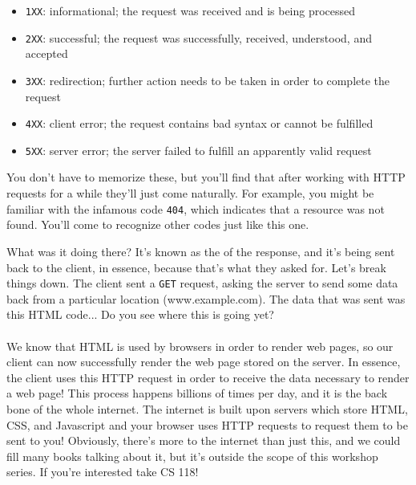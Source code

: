 \begin{itemize}
    \item \texttt{1XX}: informational; the request was received and is being processed
    \item \texttt{2XX}: successful; the request was successfully, received, understood, and accepted
    \item \texttt{3XX}: redirection; further action needs to be taken in order to complete the request
    \item \texttt{4XX}: client error; the request contains bad syntax or cannot be fulfilled
    \item \texttt{5XX}: server error; the server failed to fulfill an apparently valid request
\end{itemize}



You don't have to memorize these, but you'll find that after working with HTTP requests for a while they'll just come naturally. For example, you might be familiar with the infamous code \texttt{404}, which indicates that a resource was not found. You'll come to recognize other codes just like this one.

\begin{kaobox}[title=About the HTML we saw before\dots]
    What was it doing there? It's known as the  of the response, and it's being sent back to the client, in essence, because that's what they asked for. Let's break things down. The client sent a \texttt{GET} request, asking the server to send some data back from a particular location (www.example.com). The data that was sent was this HTML code... Do you see where this is going yet? \\ \\
    We know that HTML is used by browsers in order to render web pages, so our client can now successfully render the web page stored on the server. In essence, the client uses this HTTP request in order to receive the data necessary to render a web page! This process happens billions of times per day, and it is the back bone of the whole internet. The internet is built upon servers which store HTML, CSS, and Javascript and your browser uses HTTP requests to request them to be sent to you! Obviously, there's more to the internet than just this, and we could fill many books talking about it, but it's outside the scope of this workshop series. If you're interested take CS 118!
\end{kaobox}

